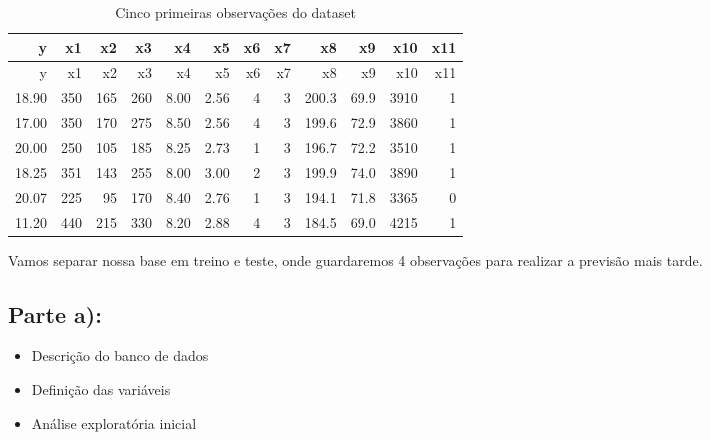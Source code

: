 \documentclass[
]{article}
\newenvironment{Shaded}{\begin{snugshade}}{\end{snugshade}}
\newcommand{\DecValTok}[1]{\textcolor[rgb]{0.00,0.00,0.81}{#1}}
\newcommand{\KeywordTok}[1]{\textcolor[rgb]{0.13,0.29,0.53}{\textbf{#1}}}
\newcommand{\NormalTok}[1]{#1}
\newcommand{\OperatorTok}[1]{\textcolor[rgb]{0.81,0.36,0.00}{\textbf{#1}}}
\newcommand{\StringTok}[1]{\textcolor[rgb]{0.31,0.60,0.02}{#1}}
\providecommand{\tightlist}{%
  \setlength{\itemsep}{0pt}\setlength{\parskip}{0pt}}
\begin{document}
\begin{longtable}[]{@{}rrrrrrrrrrrr@{}}
\caption{Cinco primeiras observações do dataset}\tabularnewline
\toprule
y & x1 & x2 & x3 & x4 & x5 & x6 & x7 & x8 & x9 & x10 &
x11\tabularnewline
\midrule
\endfirsthead
\toprule
y & x1 & x2 & x3 & x4 & x5 & x6 & x7 & x8 & x9 & x10 &
x11\tabularnewline
\midrule
\endhead
18.90 & 350 & 165 & 260 & 8.00 & 2.56 & 4 & 3 & 200.3 & 69.9 & 3910 &
1\tabularnewline
17.00 & 350 & 170 & 275 & 8.50 & 2.56 & 4 & 3 & 199.6 & 72.9 & 3860 &
1\tabularnewline
20.00 & 250 & 105 & 185 & 8.25 & 2.73 & 1 & 3 & 196.7 & 72.2 & 3510 &
1\tabularnewline
18.25 & 351 & 143 & 255 & 8.00 & 3.00 & 2 & 3 & 199.9 & 74.0 & 3890 &
1\tabularnewline
20.07 & 225 & 95 & 170 & 8.40 & 2.76 & 1 & 3 & 194.1 & 71.8 & 3365 &
0\tabularnewline
11.20 & 440 & 215 & 330 & 8.20 & 2.88 & 4 & 3 & 184.5 & 69.0 & 4215 &
1\tabularnewline
\bottomrule
\end{longtable}

Vamos separar nossa base em treino e teste, onde guardaremos 4
observações para realizar a previsão mais tarde.

\begin{Shaded}
\end{Shaded}

\hypertarget{parte-a}{%
\subsection{\texorpdfstring{Parte
\textbf{a)}:}{Parte a):}}\label{parte-a}}

\begin{itemize}
\tightlist
\item
  Descrição do banco de dados
\item
  Definição das variáveis
\item
  Análise exploratória inicial
\end{itemize}
\end{document}
